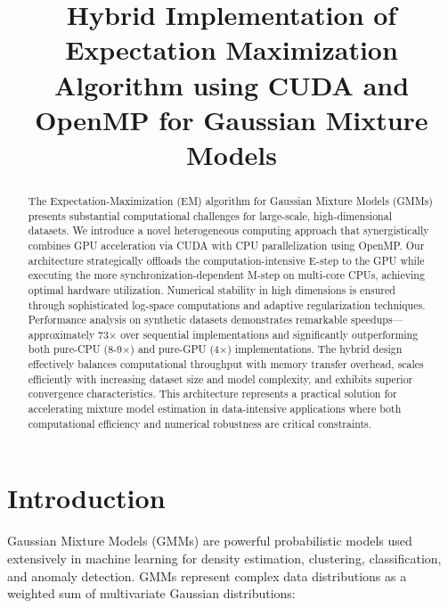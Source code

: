 \documentclass[conference]{IEEEtran}
\begin{document}
\title{Hybrid Implementation of Expectation Maximization Algorithm using CUDA and OpenMP for Gaussian Mixture Models}

\author{
}

\maketitle

\begin{abstract}
    The Expectation-Maximization (EM) algorithm for Gaussian Mixture Models (GMMs) presents substantial computational challenges for large-scale, high-dimensional datasets. We introduce a novel heterogeneous computing approach that synergistically combines GPU acceleration via CUDA with CPU parallelization using OpenMP. Our architecture strategically offloads the computation-intensive E-step to the GPU while executing the more synchronization-dependent M-step on multi-core CPUs, achieving optimal hardware utilization. Numerical stability in high dimensions is ensured through sophisticated log-space computations and adaptive regularization techniques. Performance analysis on synthetic datasets demonstrates remarkable speedups—approximately 73× over sequential implementations and significantly outperforming both pure-CPU (8-9×) and pure-GPU (4×) implementations. The hybrid design effectively balances computational throughput with memory transfer overhead, scales efficiently with increasing dataset size and model complexity, and exhibits superior convergence characteristics. This architecture represents a practical solution for accelerating mixture model estimation in data-intensive applications where both computational efficiency and numerical robustness are critical constraints.
\end{abstract}

\section{Introduction}
\label{intro}

Gaussian Mixture Models (GMMs) are powerful probabilistic models used extensively in machine learning for density estimation, clustering, classification, and anomaly detection. GMMs represent complex data distributions as a weighted sum of multivariate Gaussian distributions:
\end{document}
